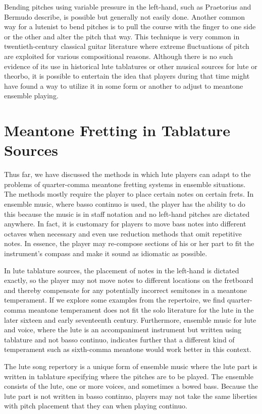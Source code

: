 Bending pitches using variable pressure in the left-hand, such as Praetorius and Bermudo
describe, is possible but generally not easily done.  Another common way for a lutenist to
bend pitches is to pull the course with the finger to one side or the other and alter the
pitch that way. This technique is very common in twentieth-century classical guitar
literature where extreme fluctuations of pitch are exploited for various compositional
reasons. Although there is no such evidence of its use in historical lute tablatures or
other musical sources for lute or theorbo, it is possible to entertain the idea that
players during that time might have found a way to utilize it in some form or another to
adjust to meantone ensemble playing.

\section{Meantone Fretting in Tablature Sources}

Thus far, we have discussed the methods in which lute players can adapt to the problems
of quarter-comma meantone fretting systems in ensemble situations.  The methods mostly
require the player to place certain notes on certain frets.  In ensemble music, where
basso continuo is used, the player has the ability to do this because the music is in
staff notation and no left-hand pitches are dictated anywhere.  In fact, it is
customary for players to move bass notes into different octaves when necessary and even
use reduction methods that omit repetitive notes.  In essence, the player may
re-compose sections of his or her part to fit the instrument's compass and make it
sound as idiomatic as possible.

In lute tablature sources, the placement of notes in the left-hand is dictated exactly,
so the player may not move notes to different locations on the fretboard and thereby
compensate for any potentially incorrect semitones in a meantone temperament.  If we
explore some examples from the repertoire, we find quarter-comma meantone temperament
does not fit the solo literature for the lute in the later sixteen and early
seventeenth century. Furthermore, ensemble music for lute and voice, where the lute is
an accompaniment instrument but written using tablature and not basso continuo,
indicates further that a different kind of temperament such as sixth-comma meantone
would work better in this context.

The lute song repertory is a unique form of ensemble music where the lute part is
written in tablature specifying where the pitches are to be played. The ensemble
consists of the lute, one or more voices, and sometimes a bowed bass.  Because the lute
part is not written in basso continuo, players may not take the same liberties with
pitch placement that they can when playing continuo.

